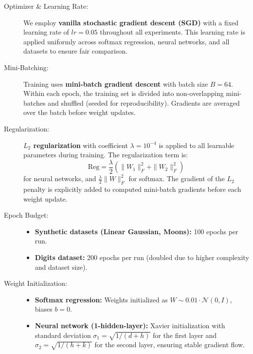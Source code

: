 \documentclass[sigconf,screen,nonacm]{acmart}
\begin{document}
\begin{description}
    \item[Optimizer \& Learning Rate:] We employ \textbf{vanilla stochastic gradient descent (SGD)} with a fixed learning rate of $lr = 0.05$ throughout all experiments. This learning rate is applied uniformly across softmax regression, neural networks, and all datasets to ensure fair comparison.

    \item[Mini-Batching:] Training uses \textbf{mini-batch gradient descent} with batch size $B = 64$. Within each epoch, the training set is divided into non-overlapping mini-batches and shuffled (seeded for reproducibility). Gradients are averaged over the batch before weight updates.

    \item[Regularization:] \textbf{$L_2$ regularization} with coefficient $\lambda = 10^{-4}$ is applied to all learnable parameters during training. The regularization term is:
    \[
    \text{Reg} = \frac{\lambda}{2} (\|W_1\|_F^2 + \|W_2\|_F^2)
    \]
    for neural networks, and $\frac{\lambda}{2} \|W\|_F^2$ for softmax. The gradient of the $L_2$ penalty is explicitly added to computed mini-batch gradients before each weight update.

    \item[Epoch Budget:] \hfill
    \begin{itemize}
        \item \textbf{Synthetic datasets (Linear Gaussian, Moons):} 100 epochs per run.
        \item \textbf{Digits dataset:} 200 epochs per run (doubled due to higher complexity and dataset size).
    \end{itemize}

    \item[Weight Initialization:] \hfill
    \begin{itemize}
        \item \textbf{Softmax regression:} Weights initialized as $W \sim 0.01 \cdot \mathcal{N}(0, I)$, biases $b = 0$.
        \item \textbf{Neural network (1-hidden-layer):} Xavier initialization with standard deviation $\sigma_1 = \sqrt{1/(d+h)}$ for the first layer and $\sigma_2 = \sqrt{1/(h+k)}$ for the second layer, ensuring stable gradient flow.
    \end{itemize}


\end{description}
\end{document}
